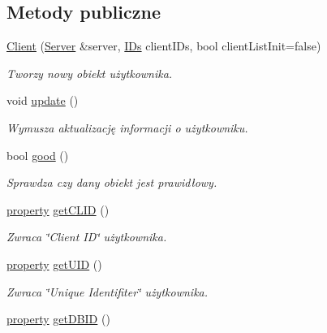 \subsection*{Metody publiczne}
\begin{DoxyCompactItemize}
\item 
\hyperlink{class_ts3_api_1_1_client_ad63f5acca38e884294bdf24883fac068}{Client} (\hyperlink{class_ts3_api_1_1_server}{Server} \&server, \hyperlink{struct_ts3_api_1_1_client_1_1_i_ds}{I\+Ds} client\+I\+Ds, bool client\+List\+Init=false)
\begin{DoxyCompactList}\small\item\em Tworzy nowy obiekt użytkownika. \end{DoxyCompactList}\item 
void \hyperlink{class_ts3_api_1_1_client_a6e7a5e19c40bef39ae1c0f5996b8c471}{update} ()
\begin{DoxyCompactList}\small\item\em Wymusza aktualizację informacji o użytkowniku. \end{DoxyCompactList}\item 
bool \hyperlink{class_ts3_api_1_1_client_a52f9b3ce0e014563b757afdd6fff4628}{good} ()
\begin{DoxyCompactList}\small\item\em Sprawdza czy dany obiekt jest prawidłowy. \end{DoxyCompactList}\item 
\hyperlink{struct_ts3_api_1_1_client_1_1property}{property} \hyperlink{class_ts3_api_1_1_client_a72d6480e7f921ce9694dffeadab1b79a}{get\+C\+L\+ID} ()\hypertarget{class_ts3_api_1_1_client_a72d6480e7f921ce9694dffeadab1b79a}{}\label{class_ts3_api_1_1_client_a72d6480e7f921ce9694dffeadab1b79a}

\begin{DoxyCompactList}\small\item\em Zwraca \char`\"{}\+Client I\+D\char`\"{} użytkownika. \end{DoxyCompactList}\item 
\hyperlink{struct_ts3_api_1_1_client_1_1property}{property} \hyperlink{class_ts3_api_1_1_client_a4f145da31772f851628c0a87042c2942}{get\+U\+ID} ()\hypertarget{class_ts3_api_1_1_client_a4f145da31772f851628c0a87042c2942}{}\label{class_ts3_api_1_1_client_a4f145da31772f851628c0a87042c2942}

\begin{DoxyCompactList}\small\item\em Zwraca \char`\"{}\+Unique Identifiter\char`\"{} użytkownika. \end{DoxyCompactList}\item 
\hyperlink{struct_ts3_api_1_1_client_1_1property}{property} \hyperlink{class_ts3_api_1_1_client_a3854f5517090c0e8428b2de31aac878a}{get\+D\+B\+ID} ()\hypertarget{class_ts3_api_1_1_client_a3854f5517090c0e8428b2de31aac878a}{}\label{class_ts3_api_1_1_client_a3854f5517090c0e8428b2de31aac878a}


\end{DoxyCompactItemize}
